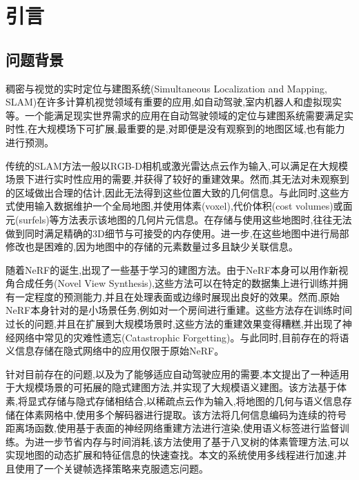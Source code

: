 \section{引言}\label{introduction}

\subsection{问题背景}

稠密与视觉的实时定位与建图系统(Simultaneous Localization and Mapping, SLAM)在许多计算机视觉领域有重要的应用,如自动驾驶,室内机器人和虚拟现实等。一个能满足现实世界需求的应用在自动驾驶领域的定位与建图系统需要满足实时性,在大规模场下可扩展,最重要的是,对即便是没有观察到的地图区域,也有能力进行预测。

传统的SLAM方法一般以RGB-D相机或激光雷达点云作为输入,可以满足在大规模场景下进行实时性应用的需要,并获得了较好的重建效果。然而,其无法对未观察到的区域做出合理的估计,因此无法得到这些位置大致的几何信息。与此同时,这些方式使用输入数据维护一个全局地图,并使用体素\cite{kahler}(voxel),代价体积\cite{learningDS}(cost volumes)或面元\cite{FusionDS}(surfels)等方法表示该地图的几何片元信息。在存储与使用这些地图时,往往无法做到同时满足精确的3D细节与可接受的内存使用。进一步,在这些地图中进行局部修改也是困难的,因为地图中的存储的元素数量过多且缺少关联信息。

随着NeRF\cite{nerf}的诞生,出现了一些基于学习的建图方法。由于NeRF本身可以用作新视角合成任务(Novel View Synthesis),这些方法可以在特定的数据集上进行训练并拥有一定程度的预测能力,并且在处理表面或边缘时展现出良好的效果。然而,原始NeRF本身针对的是小场景任务,例如对一个房间进行重建。这些方法存在训练时间过长的问题,并且在扩展到大规模场景时,这些方法的重建效果变得糟糕,并出现了神经网络中常见的灾难性遗忘(Catastrophic Forgetting)。与此同时,目前存在的将语义信息存储在隐式网络中的应用仅限于原始NeRF。

针对目前存在的问题,以及为了能够适应自动驾驶应用的需要,本文提出了一种适用于大规模场景的可拓展的隐式建图方法,并实现了大规模语义建图。该方法基于体素,将显式存储与隐式存储相结合,以稀疏点云作为输入,将地图的几何与语义信息存储在体素网格中,使用多个解码器进行提取。该方法将几何信息编码为连续的符号距离场函数,使用基于表面的神经网络重建方法进行渲染,使用语义标签进行监督训练。为进一步节省内存与时间消耗,该方法使用了基于八叉树的体素管理方法,可以实现地图的动态扩展和特征信息的快速查找。本文的系统使用多线程进行加速,并且使用了一个关键帧选择策略来克服遗忘问题。
